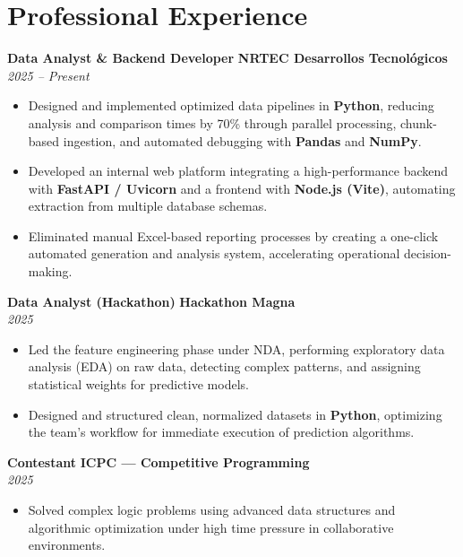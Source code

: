 \documentclass[10pt,a4paper]{article}
\begin{document}
\section{Professional Experience}

\noindent\textbf{Data Analyst \& Backend Developer} \hfill \textbf{NRTEC Desarrollos Tecnológicos} \\
\textit{2025 -- Present}
\begin{itemize}[leftmargin=*,nosep,after=\vspace{0.05em},itemsep=0pt]
  \item Designed and implemented optimized data pipelines in \textbf{Python}, reducing analysis and comparison times by 70\% through parallel processing, chunk-based ingestion, and automated debugging with \textbf{Pandas} and \textbf{NumPy}.
  \item Developed an internal web platform integrating a high-performance backend with \textbf{FastAPI / Uvicorn} and a frontend with \textbf{Node.js (Vite)}, automating extraction from multiple database schemas.
  \item Eliminated manual Excel-based reporting processes by creating a one-click automated generation and analysis system, accelerating operational decision-making.
\end{itemize}

\noindent\textbf{Data Analyst (Hackathon)} \hfill \textbf{Hackathon Magna} \\
\textit{2025}
\begin{itemize}[leftmargin=*,nosep,after=\vspace{0.05em},itemsep=0pt]
  \item Led the feature engineering phase under NDA, performing exploratory data analysis (EDA) on raw data, detecting complex patterns, and assigning statistical weights for predictive models.
  \item Designed and structured clean, normalized datasets in \textbf{Python}, optimizing the team's workflow for immediate execution of prediction algorithms.
\end{itemize}

\noindent\textbf{Contestant} \hfill \textbf{ICPC --- Competitive Programming} \\
\textit{2025}
\begin{itemize}[leftmargin=*,nosep,after=\vspace{0.05em},itemsep=0pt]
  \item Solved complex logic problems using advanced data structures and algorithmic optimization under high time pressure in collaborative environments.
\end{itemize}
\end{document}

